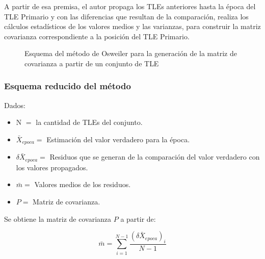 A partir de esa premisa, el autor propaga los TLEs anteriores hasta la \'epoca del TLE Primario y con las diferencias que resultan de la comparaci\'on, realiza los c\'alculos estad\'isticos de los valores medios y las varianzas, para construir la matriz covarianza correspondiente a la posici\'on del TLE Primario.\\

\begin{figure}[!h]
\centering
{}
\caption[M\'etodo de Osweiler, \citep{osweiler} para la generaci\'on de la matriz de covarianza]{Esquema del m\'etodo de Osweiler \citep{osweiler} para la generaci\'on de la matriz de covarianza a partir de un conjunto de TLE}
\label{fig:tleosw}
\end{figure}

\subsubsection*{Esquema reducido del m\'etodo}

Dados:
\begin{itemize}
\itemsep0em
 \item N $=$ la cantidad de TLEs del conjunto.
 \item $\bar{X}_{epoca} = $  Estimaci\'on del valor verdadero para la \'epoca.
 \item $\delta \bar{X}_{epoca} = $ Residuos que se generan de la comparaci\'on del valor verdadero con los valores propagados.
 \item $\bar{m} = $ Valores medios de los residuos.
 \item $P = $ Matriz de covarianza.
\end{itemize}

Se obtiene la matriz de covarianza $P$ a partir de:

\begin{equation}
 \bar{m}=\sum_{i=1}^{N-1} \frac{(\delta \bar{X}_{epoca})_{i}}{N-1} 
\end{equation}

